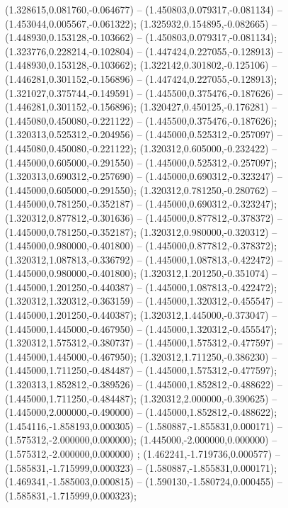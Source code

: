  (1.328615,0.081760,-0.064677) -- (1.450803,0.079317,-0.081134) -- (1.453044,0.005567,-0.061322);
 (1.325932,0.154895,-0.082665) -- (1.448930,0.153128,-0.103662) -- (1.450803,0.079317,-0.081134);
 (1.323776,0.228214,-0.102804) -- (1.447424,0.227055,-0.128913) -- (1.448930,0.153128,-0.103662);
 (1.322142,0.301802,-0.125106) -- (1.446281,0.301152,-0.156896) -- (1.447424,0.227055,-0.128913);
 (1.321027,0.375744,-0.149591) -- (1.445500,0.375476,-0.187626) -- (1.446281,0.301152,-0.156896);
 (1.320427,0.450125,-0.176281) -- (1.445080,0.450080,-0.221122) -- (1.445500,0.375476,-0.187626);
 (1.320313,0.525312,-0.204956) -- (1.445000,0.525312,-0.257097) -- (1.445080,0.450080,-0.221122);
 (1.320312,0.605000,-0.232422) -- (1.445000,0.605000,-0.291550) -- (1.445000,0.525312,-0.257097);
 (1.320313,0.690312,-0.257690) -- (1.445000,0.690312,-0.323247) -- (1.445000,0.605000,-0.291550);
 (1.320312,0.781250,-0.280762) -- (1.445000,0.781250,-0.352187) -- (1.445000,0.690312,-0.323247);
 (1.320312,0.877812,-0.301636) -- (1.445000,0.877812,-0.378372) -- (1.445000,0.781250,-0.352187);
 (1.320312,0.980000,-0.320312) -- (1.445000,0.980000,-0.401800) -- (1.445000,0.877812,-0.378372);
 (1.320312,1.087813,-0.336792) -- (1.445000,1.087813,-0.422472) -- (1.445000,0.980000,-0.401800);
 (1.320312,1.201250,-0.351074) -- (1.445000,1.201250,-0.440387) -- (1.445000,1.087813,-0.422472);
 (1.320312,1.320312,-0.363159) -- (1.445000,1.320312,-0.455547) -- (1.445000,1.201250,-0.440387);
 (1.320312,1.445000,-0.373047) -- (1.445000,1.445000,-0.467950) -- (1.445000,1.320312,-0.455547);
 (1.320312,1.575312,-0.380737) -- (1.445000,1.575312,-0.477597) -- (1.445000,1.445000,-0.467950);
 (1.320312,1.711250,-0.386230) -- (1.445000,1.711250,-0.484487) -- (1.445000,1.575312,-0.477597);
 (1.320313,1.852812,-0.389526) -- (1.445000,1.852812,-0.488622) -- (1.445000,1.711250,-0.484487);
 (1.320312,2.000000,-0.390625) -- (1.445000,2.000000,-0.490000) -- (1.445000,1.852812,-0.488622);
 (1.454116,-1.858193,0.000305) -- (1.580887,-1.855831,0.000171) -- (1.575312,-2.000000,0.000000);
 (1.445000,-2.000000,0.000000) -- (1.575312,-2.000000,0.000000) ;
 (1.462241,-1.719736,0.000577) -- (1.585831,-1.715999,0.000323) -- (1.580887,-1.855831,0.000171);
 (1.469341,-1.585003,0.000815) -- (1.590130,-1.580724,0.000455) -- (1.585831,-1.715999,0.000323);
